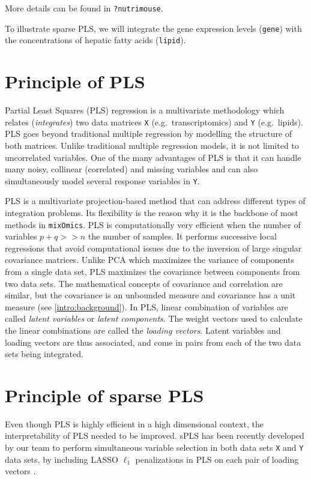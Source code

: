 \documentclass[]{book}
\theoremstyle{definition}
\theoremstyle{definition}
\theoremstyle{definition}
\theoremstyle{remark}
\begin{document}
More details can be found in \texttt{?nutrimouse}.

To illustrate sparse PLS, we will integrate the gene expression levels
(\texttt{gene}) with the concentrations of hepatic fatty acids
(\texttt{lipid}).

\section{Principle of PLS}\label{principle-of-pls}

Partial Least Squares (PLS) regression \citep{Wol66, Wol01} is a
multivariate methodology which relates (\textit{integrates}) two data
matrices \texttt{X} (e.g.~transcriptomics) and \texttt{Y} (e.g.~lipids).
PLS goes beyond traditional multiple regression by modelling the
structure of both matrices. Unlike traditional multiple regression
models, it is not limited to uncorrelated variables. One of the many
advantages of PLS is that it can handle many noisy, collinear
(correlated) and missing variables and can also simultaneously model
several response variables in \texttt{Y}.

PLS is a multivariate projection-based method that can address different
types of integration problems. Its flexibility is the reason why it is
the backbone of most methods in \texttt{mixOmics}. PLS is
computationally very efficient when the number of variables
\(p + q >> n\) the number of samples. It performs successive local
regressions that avoid computational issues due to the inversion of
large singular covariance matrices. Unlike PCA which maximizes the
variance of components from a single data set, PLS maximizes the
covariance between components from two data sets. The mathematical
concepts of covariance and correlation are similar, but the covariance
is an unbounded measure and covariance has a unit measure (see
\ref{intro:background}). In PLS, linear combination of variables are
called \emph{latent variables} or \emph{latent components}. The weight
vectors used to calculate the linear combinations are called the
\emph{loading vectors}. Latent variables and loading vectors are thus
associated, and come in pairs from each of the two data sets being
integrated.

\section{Principle of sparse PLS}\label{principle-of-sparse-pls}

Even though PLS is highly efficient in a high dimensional context, the
interpretability of PLS needed to be improved. sPLS has been recently
developed by our team to perform simultaneous variable selection in both
data sets \texttt{X} and \texttt{Y} data sets, by including LASSO
\(\ell_1\) penalizations in PLS on each pair of loading vectors
\citep{Lec08}.
\end{document}
